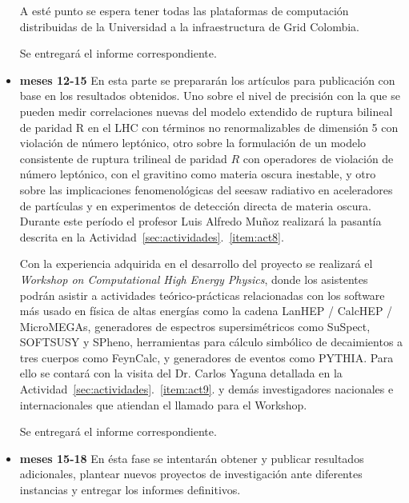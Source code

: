 \begin{itemize}
  A esté punto se espera tener todas las plataformas de computación
  distribuidas de la Universidad a la infraestructura de Grid
  Colombia. 

  Se entregará el informe correspondiente.

\item \textbf{meses 12-15} En esta parte se prepararán los artículos
  para publicación con base en los resultados obtenidos. Uno sobre el
  nivel de precisión con la que se pueden medir correlaciones nuevas
  del modelo extendido de ruptura bilineal de paridad R en el LHC con
  términos no renormalizables de dimensión 5 con violación de número
  leptónico, otro sobre la formulación de un modelo consistente de
  ruptura trilineal de paridad $R$ con operadores de violación de
  número leptónico, con el gravitino como materia oscura inestable, y
  otro sobre las implicaciones fenomenológicas del seesaw radiativo en
  aceleradores de partículas y en experimentos de detección directa de
  materia oscura. Durante este período el profesor Luis Alfredo Muñoz
  realizará la pasantía descrita en la
  Actividad~\ref{sec:actividades}.~\ref{item:act8}. 

  Con la experiencia adquirida en el desarrollo del proyecto se
  realizará el \emph{Workshop on Computational High Energy Physics},
  donde los asistentes podrán asistir a actividades teórico-prácticas
  relacionadas con los software más usado en física de altas energías
  como la cadena LanHEP / CalcHEP / MicroMEGAs, generadores de espectros
  supersimétricos como SuSpect, SOFTSUSY y SPheno, herramientas para
  cálculo simbólico de decaimientos a tres cuerpos como FeynCalc, y
  generadores de eventos como PYTHIA. Para ello se contará con la
  visita del Dr. Carlos Yaguna detallada en la
  Actividad~\ref{sec:actividades}.~\ref{item:act9}. y demás
  investigadores nacionales e internacionales que atiendan el llamado
  para el Workshop.

  Se entregará el informe correspondiente.
\item \textbf{meses 15-18}
  En ésta fase se intentarán obtener y publicar resultados
  adicionales, plantear nuevos proyectos de investigación ante
  diferentes instancias y entregar los informes definitivos.
\end{itemize}

